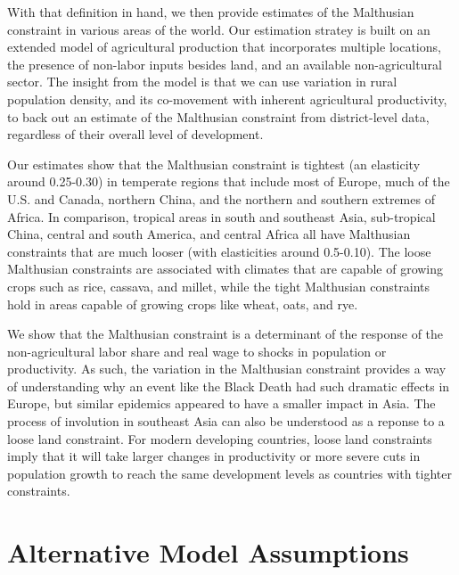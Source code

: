 \documentclass[11pt]{article}
\begin{document}
With that definition in hand, we then provide estimates of the Malthusian constraint in various areas of the world. Our estimation stratey is built on an extended model of agricultural production that incorporates multiple locations, the presence of non-labor inputs besides land, and an available non-agricultural sector. The insight from the model is that we can use variation in rural population density, and its co-movement with inherent agricultural productivity, to back out an estimate of the Malthusian constraint from district-level data, regardless of their overall level of development.

Our estimates show that the Malthusian constraint is tightest (an elasticity around 0.25-0.30) in temperate regions that include most of Europe, much of the U.S. and Canada, northern China, and the northern and southern extremes of Africa. In comparison, tropical areas in south and southeast Asia, sub-tropical China, central and south America, and central Africa all have Malthusian constraints that are much looser (with elasticities around 0.5-0.10). The loose Malthusian constraints are associated with climates that are capable of growing crops such as rice, cassava, and millet, while the tight Malthusian constraints hold in areas capable of growing crops like wheat, oats, and rye.

We show that the Malthusian constraint is a determinant of the response of the non-agricultural labor share and real wage to shocks in population or productivity. As such, the variation in the Malthusian constraint provides a way of understanding why an event like the Black Death had such dramatic effects in Europe, but similar epidemics appeared to have a smaller impact in Asia. The process of involution in southeast Asia can also be understood as a reponse to a loose land constraint. For modern developing countries, loose land constraints imply that it will take larger changes in productivity or more severe cuts in population growth to reach the same development levels as countries with tighter constraints.

\newpage
\clearpage

\setcounter{section}{0}
\renewcommand{\thesection}{Appendix \Alph{section}}

\singlespacing

\section{Alternative Model Assumptions}
\end{document}
